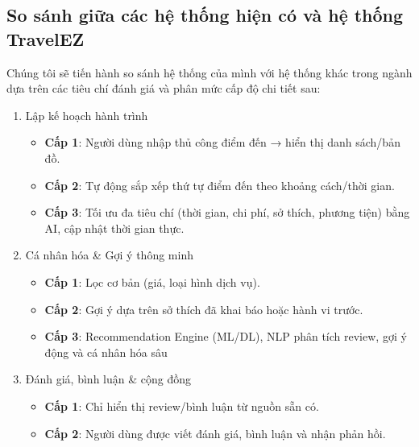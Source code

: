 \subsection{So sánh giữa các hệ thống hiện có và hệ thống TravelEZ}
Chúng tôi sẽ tiến hành so sánh hệ thống của mình với hệ thống khác trong ngành dựa trên các tiêu chí đánh giá và phân mức cấp độ chi tiết sau:
\begin{enumerate}
    \item Lập kế hoạch hành trình
        \begin{itemize}
            \item \textbf{Cấp 1}: Người dùng nhập thủ công điểm đến → hiển thị danh sách/bản đồ.
            \item \textbf{Cấp 2}: Tự động sắp xếp thứ tự điểm đến theo khoảng cách/thời gian.
            \item \textbf{Cấp 3}: Tối ưu đa tiêu chí (thời gian, chi phí, sở thích, phương tiện) bằng AI, cập nhật thời gian thực.
        \end{itemize}
    \item Cá nhân hóa \& Gợi ý thông minh
        \begin{itemize}
            \item \textbf{Cấp 1}: Lọc cơ bản (giá, loại hình dịch vụ).
            \item \textbf{Cấp 2}: Gợi ý dựa trên sở thích đã khai báo hoặc hành vi trước.
            \item \textbf{Cấp 3}: Recommendation Engine (ML/DL), NLP phân tích review, gợi ý động và cá nhân hóa sâu
        \end{itemize}
    \item Đánh giá, bình luận \& cộng đồng
        \begin{itemize}
            \item \textbf{Cấp 1}: Chỉ hiển thị review/bình luận từ nguồn sẵn có.
            \item \textbf{Cấp 2}: Người dùng được viết đánh giá, bình luận và nhận phản hồi.

\end{itemize}
\end{enumerate}
